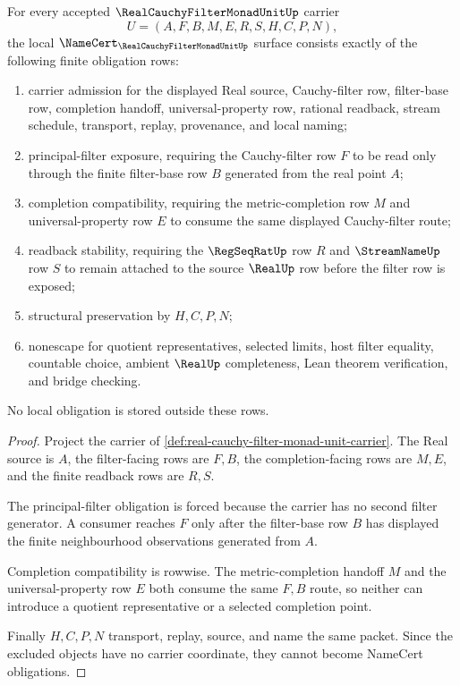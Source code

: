 \begin{theorem}
\label{thm:real-cauchy-filter-monad-unit-obligations}
For every accepted $\RealCauchyFilterMonadUnitUp$ carrier
$$
U=(A,F,B,M,E,R,S,H,C,P,N),
$$
the local $\NameCert_{\RealCauchyFilterMonadUnitUp}$ surface consists exactly of the following finite obligation rows:
\begin{enumerate}
\item carrier admission for the displayed Real source, Cauchy-filter row, filter-base row, completion handoff, universal-property row, rational readback, stream schedule, transport, replay, provenance, and local naming;
\item principal-filter exposure, requiring the Cauchy-filter row $F$ to be read only through the finite filter-base row $B$ generated from the real point $A$;
\item completion compatibility, requiring the metric-completion row $M$ and universal-property row $E$ to consume the same displayed Cauchy-filter route;
\item readback stability, requiring the $\RegSeqRatUp$ row $R$ and $\StreamNameUp$ row $S$ to remain attached to the source $\RealUp$ row before the filter row is exposed;
\item structural preservation by $H,C,P,N$;
\item nonescape for quotient representatives, selected limits, host filter equality, countable choice, ambient $\RealUp$ completeness, Lean theorem verification, and bridge checking.
\end{enumerate}
No local obligation is stored outside these rows.
\end{theorem}
\begin{proof}
Project the carrier of \autoref{def:real-cauchy-filter-monad-unit-carrier}. The Real source is $A$, the filter-facing rows are $F,B$, the completion-facing rows are $M,E$, and the finite readback rows are $R,S$.

The principal-filter obligation is forced because the carrier has no second filter generator. A consumer reaches $F$ only after the filter-base row $B$ has displayed the finite neighbourhood observations generated from $A$.

Completion compatibility is rowwise. The metric-completion handoff $M$ and the universal-property row $E$ both consume the same $F,B$ route, so neither can introduce a quotient representative or a selected completion point.

Finally $H,C,P,N$ transport, replay, source, and name the same packet. Since the excluded objects have no carrier coordinate, they cannot become NameCert obligations.
\end{proof}

